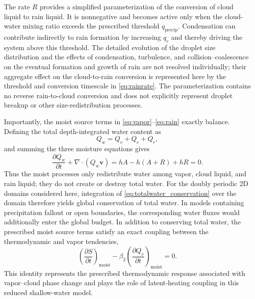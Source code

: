 \documentclass[12pt]{article}
\begin{document}
	 
	 The rate $R$ provides a simplified parameterization of the conversion of cloud liquid to rain liquid. It is nonnegative and becomes active only when the cloud-water mixing ratio exceeds the prescribed threshold $q_{\mathrm{precip}}$. Condensation can contribute indirectly to rain formation by increasing $q_c$ and thereby driving the system above this threshold. The detailed evolution of the droplet size distribution and the effects of condensation, turbulence, and collision--coalescence on the
	 eventual formation and growth of rain are not resolved individually; their aggregate effect on the cloud-to-rain conversion is represented here by the threshold and conversion timescale in \eqref{eq:rainrate}. The parameterization contains no reverse rain-to-cloud conversion and does not explicitly represent droplet breakup or other size-redistribution processes.
	 
	 Importantly, the moist source terms in \eqref{eq:vapor}--\eqref{eq:rain} exactly balance. Defining the total depth-integrated water content as
\begin{equation}
	Q_w = Q_v + Q_c + Q_r,
	\label{eq:totalwater}
\end{equation}
and summing the three moisture equations gives
\begin{equation}
	\frac{\partial Q_w}{\partial t}
	+
	\nabla\cdot(Q_w\mathbf{v})=
	hA-h(A+R)+hR=0.
	\label{eq:totalwater_conservation}
\end{equation}
	Thus the moist processes only redistribute water among vapor, cloud liquid, and rain liquid; they do not create or destroy total water. For the doubly periodic 2D domains considered here, integration of \eqref{eq:totalwater_conservation} over the domain therefore yields global conservation of total water. In models containing precipitation fallout or open boundaries, the corresponding water fluxes would additionally enter the global budget. In addition to conserving total water, the prescribed moist source
	terms satisfy an exact coupling between the thermodynamic and vapor
	tendencies,
	\begin{equation}
		\left(\frac{\partial S}{\partial t}\right)_{\mathrm{moist}}
		-
		\beta_2
		\left(\frac{\partial Q_v}{\partial t}\right)_{\mathrm{moist}}
		=0.
		\label{eq:thermal_moist_identity}
	\end{equation}
	This identity represents the prescribed thermodynamic response associated with vapor--cloud phase change and plays the role of latent-heating coupling in this reduced shallow-water model.
	
\end{document}
